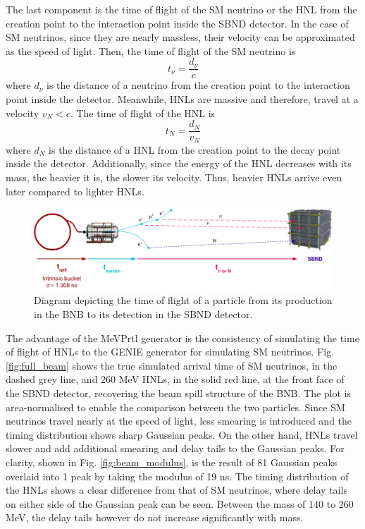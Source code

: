 The last component is the time of flight of the SM neutrino or the HNL from the creation point to the interaction point inside the SBND detector.
In the case of SM neutrinos, since they are nearly massless, their velocity can be approximated as the speed of light. 
Then, the time of flight of the SM neutrino is  
\begin{equation}
	t_{\nu} = \frac{d_{\nu}}{c}
\end{equation}
where $d_{\nu}$ is the distance of a neutrino from the creation point to the interaction point inside the detector.
Meanwhile, HNLs are massive and therefore, travel at a velocity $v_N < c$.
The time of flight of the HNL is
\begin{equation}
	t_{N} = \frac{d_{N}}{v_N}
\end{equation}
where $d_N$ is the distance of a HNL from the creation point to the decay point inside the detector.
Additionally, since the energy of the HNL decreases with its mass, the heavier it is, the slower its velocity.
Thus, heavier HNLs arrive even later compared to lighter HNLs.

\begin{figure}[hb!] 
\centering    
\includegraphics[width=1.0\textwidth]{tof_beam_to_detector}
\caption[Time of Flight of Particles From the BNB to SBND Diagram]{
Diagram depicting the time of flight of a particle from its production in the BNB to its detection in the SBND detector.
}
\label{fig:tof_beam_to_detector}
\end{figure}

The advantage of the MeVPrtl generator is the consistency of simulating the time of flight of HNLs to the GENIE generator for simulating SM neutrinos.
Fig. \ref{fig:full_beam} shows the true simulated arrival time of SM neutrinos, in the dashed grey line, and 260 MeV HNLs, in the solid red line, at the front face of the SBND detector, recovering the beam spill structure of the BNB.
The plot is area-normalised to enable the comparison between the two particles. 
Since SM neutrinos travel nearly at the speed of light, less smearing is introduced and the timing distribution shows sharp Gaussian peaks.
On the other hand, HNLs travel slower and add additional smearing and delay tails to the Gaussian peaks.
For clarity, shown in Fig. \ref{fig:beam_modulus}, is the result of 81 Gaussian peaks overlaid into 1 peak by taking the modulus of 19 ns.
The timing distribution of the HNLs shows a clear difference from that of SM neutrinos, where delay tails on either side of the Gaussian peak can be seen.
Between the mass of 140 to 260 MeV, the delay tails however do not increase significantly with mass.

